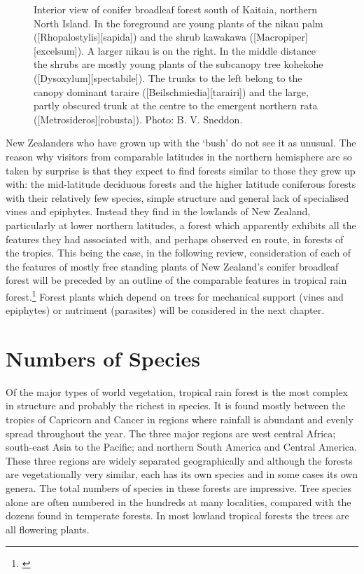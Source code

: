 \begin{figure}[htb]
\begin{minipage}[t]{0.446\textwidth}
    	\caption[Interior view of conifer broadleaf forest south of Kaitaia]{Interior view of conifer broadleaf forest south of Kaitaia, northern North Island.
    	In the foreground are young plants of the nikau palm ([Rhopalostylis][sapida]) and the shrub kawakawa ([Macropiper][excelsum]).
    	A larger nikau is on the right.
    	In the middle distance the shrubs are mostly young plants of the subcanopy tree kohekohe ([Dysoxylum][spectabile]).
    	The trunks to the left belong to the canopy dominant taraire ([Beilschmiedia][tarairi]) and the large, partly obscured trunk at the centre to the emergent northern rata ([Metrosideros][robusta]).
    	Photo: B. V. Sneddon.}%
    	\label{fig:8conifer}
	\end{minipage}
\end{figure}

New Zealanders who have grown up with the `bush' do not see it as unusual.
The reason why visitors from comparable latitudes in the northern hemisphere are so taken by surprise is that they expect to find forests similar to those they grew up with: the mid-latitude deciduous forests and the higher latitude coniferous forests with their relatively few species, simple structure and general lack of specialised vines and epiphytes.
Instead they find in the lowlands of New Zealand, particularly at lower northern latitudes, a forest which apparently exhibits all the features they had associated with, and perhaps observed en route, in forests of the tropics.
This being the case, in the following review, consideration of each of the features of mostly free standing plants of New Zealand's conifer broadleaf forest will be preceded by an outline of the comparable features in tropical rain forest.\footnote{\cite{richards1952tropical}}
Forest plants which depend on trees for mechanical support (vines and epiphytes) or nutriment (parasites) will be considered in the next chapter.

\section{Numbers of Species}

Of the major types of world vegetation, tropical rain forest is the most complex in structure and probably the richest in species.
It is found mostly between the tropics of Capricorn and Cancer in regions where rainfall is abundant and evenly spread throughout the year.
The three major regions are west central Africa; south-east Asia to the Pacific; and northern South America and Central America.
These three regions are widely separated geographically and although the forests are vegetationally very similar, each has its own species and in some cases its own genera.
The total numbers of species in these forests are impressive.
Tree species alone are often numbered in the hundreds at many localities, compared with the dozens found in temperate forests.
In most lowland tropical forests the trees are all flowering plants.

